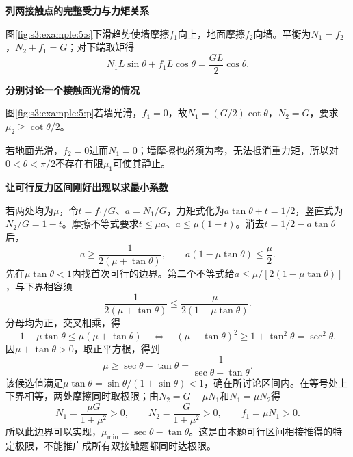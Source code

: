 \begin{solution}\textbf{列两接触点的完整受力与力矩关系}\par\nobreak
图\ref{fig:s3:example:5:s}下滑趋势使墙摩擦$f_1$向上，地面摩擦$f_2$向墙。平衡为$N_1=f_2$，$N_2+f_1=G$；对下端取矩得
\[
N_1L\sin\theta+f_1L\cos\theta=\frac{GL}2\cos\theta.
\]



\par\medskip{}\noindent\textbf{分别讨论一个接触面光滑的情况}\par\nobreak
图\ref{fig:s3:example:5:p}若墙光滑，$f_1=0$，故$N_1=(G/2)\cot\theta$，$N_2=G$，要求$\mu_2\ge\cot\theta/2$。

若地面光滑，$f_2=0$进而$N_1=0$；墙摩擦也必须为零，无法抵消重力矩，所以对$0<\theta<\pi/2$不存在有限$\mu_1$可使其静止。



\par\medskip{}\noindent\textbf{让可行反力区间刚好出现以求最小系数}\par\nobreak
若两处均为$\mu$，令$t=f_1/G$、$a=N_1/G$，力矩式化为$a\tan\theta+t=1/2$，竖直式为$N_2/G=1-t$。摩擦不等式要求$t\le\mu a$、$a\le\mu(1-t)$。消去$t=1/2-a\tan\theta$后，
\[
a\ge\frac1{2(\mu+\tan\theta)},\qquad
a(1-\mu\tan\theta)\le\frac\mu2.
\]
先在$\mu\tan\theta<1$内找首次可行的边界。第二个不等式给$a\le\mu/[2(1-\mu\tan\theta)]$，与下界相容须
\[
\frac1{2(\mu+\tan\theta)}\le
\frac\mu{2(1-\mu\tan\theta)}.
\]
分母均为正，交叉相乘，得
\[
1-\mu\tan\theta\le\mu(\mu+\tan\theta)
\quad\Longleftrightarrow\quad
(\mu+\tan\theta)^2\ge1+\tan^2\theta=\sec^2\theta.
\]
因$\mu+\tan\theta>0$，取正平方根，得到
\[
\mu\ge\sec\theta-\tan\theta
=\frac1{\sec\theta+\tan\theta}.
\]
该候选值满足$\mu\tan\theta=\sin\theta/(1+\sin\theta)<1$，确在所讨论区间内。在等号处上下界相等，两处摩擦同时取极限；由$N_2=G-\mu N_1$和$N_1=\mu N_2$得
\[
N_1=\frac{\mu G}{1+\mu^2}>0,\qquad
N_2=\frac{G}{1+\mu^2}>0,\qquad f_1=\mu N_1>0.
\]
所以此边界可以实现，$\mu_{\min}=\sec\theta-\tan\theta$。这是由本题可行区间相接推得的特定极限，不能推广成所有双接触题都同时达极限。\end{solution}
